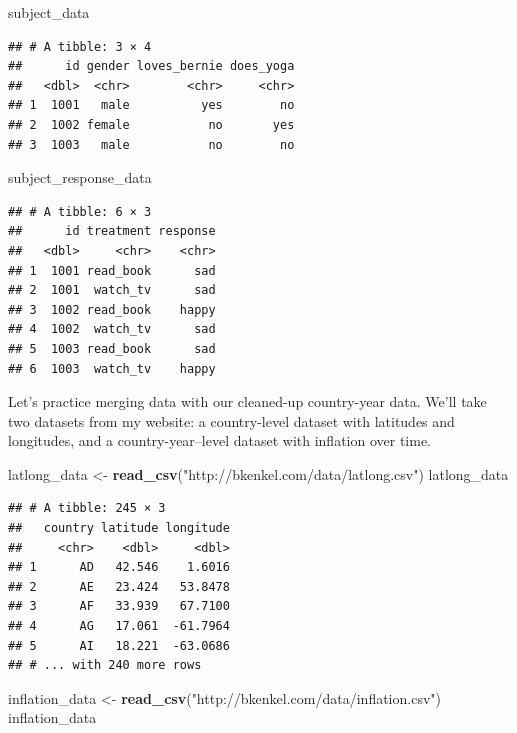 \documentclass[12pt,oneside,openany]{book}
\newenvironment{Shaded}{\begin{snugshade}}{\end{snugshade}}
\newcommand{\KeywordTok}[1]{\textcolor[rgb]{0.13,0.29,0.53}{\textbf{{#1}}}}
\newcommand{\StringTok}[1]{\textcolor[rgb]{0.31,0.60,0.02}{{#1}}}
\newcommand{\NormalTok}[1]{{#1}}
\begin{document}
\begin{Shaded}
\begin{Highlighting}[]
\NormalTok{subject_data}
\end{Highlighting}
\end{Shaded}

\begin{verbatim}
## # A tibble: 3 × 4
##      id gender loves_bernie does_yoga
##   <dbl>  <chr>        <chr>     <chr>
## 1  1001   male          yes        no
## 2  1002 female           no       yes
## 3  1003   male           no        no
\end{verbatim}

\begin{Shaded}
\begin{Highlighting}[]
\NormalTok{subject_response_data}
\end{Highlighting}
\end{Shaded}

\begin{verbatim}
## # A tibble: 6 × 3
##      id treatment response
##   <dbl>     <chr>    <chr>
## 1  1001 read_book      sad
## 2  1001  watch_tv      sad
## 3  1002 read_book    happy
## 4  1002  watch_tv      sad
## 5  1003 read_book      sad
## 6  1003  watch_tv    happy
\end{verbatim}

Let's practice merging data with our cleaned-up country-year data. We'll
take two datasets from my website: a country-level dataset with
latitudes and longitudes, and a country-year--level dataset with
inflation over time.

\begin{Shaded}
\begin{Highlighting}[]
\NormalTok{latlong_data <-}\StringTok{ }\KeywordTok{read_csv}\NormalTok{(}\StringTok{"http://bkenkel.com/data/latlong.csv"}\NormalTok{)}
\NormalTok{latlong_data}
\end{Highlighting}
\end{Shaded}

\begin{verbatim}
## # A tibble: 245 × 3
##   country latitude longitude
##     <chr>    <dbl>     <dbl>
## 1      AD   42.546    1.6016
## 2      AE   23.424   53.8478
## 3      AF   33.939   67.7100
## 4      AG   17.061  -61.7964
## 5      AI   18.221  -63.0686
## # ... with 240 more rows
\end{verbatim}

\begin{Shaded}
\begin{Highlighting}[]
\NormalTok{inflation_data <-}\StringTok{ }\KeywordTok{read_csv}\NormalTok{(}\StringTok{"http://bkenkel.com/data/inflation.csv"}\NormalTok{)}
\NormalTok{inflation_data}
\end{Highlighting}
\end{Shaded}
\end{document}
